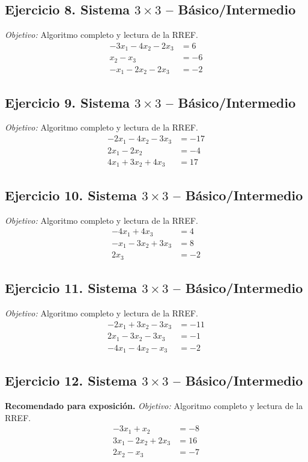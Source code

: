 \documentclass[12pt]{article}
\theoremstyle{remark}
\begin{document}
\subsection*{Ejercicio 8. Sistema $3\times3$ -- Básico/Intermedio}
\emph{Objetivo:} Algoritmo completo y lectura de la RREF.
\[
\begin{aligned}
- 3 x_{1} - 4 x_{2} - 2 x_{3} &= 6\\
x_{2} - x_{3} &= -6\\
- x_{1} - 2 x_{2} - 2 x_{3} &= -2
\end{aligned}
\]
\subsection*{Ejercicio 9. Sistema $3\times3$ -- Básico/Intermedio}
\emph{Objetivo:} Algoritmo completo y lectura de la RREF.
\[
\begin{aligned}
- 2 x_{1} - 4 x_{2} - 3 x_{3} &= -17\\
2 x_{1} - 2 x_{2} &= -4\\
4 x_{1} + 3 x_{2} + 4 x_{3} &= 17
\end{aligned}
\]
\subsection*{Ejercicio 10. Sistema $3\times3$ -- Básico/Intermedio}
\emph{Objetivo:} Algoritmo completo y lectura de la RREF.
\[
\begin{aligned}
- 4 x_{1} + 4 x_{3} &= 4\\
- x_{1} - 3 x_{2} + 3 x_{3} &= 8\\
2 x_{3} &= -2
\end{aligned}
\]
\subsection*{Ejercicio 11. Sistema $3\times3$ -- Básico/Intermedio}
\emph{Objetivo:} Algoritmo completo y lectura de la RREF.
\[
\begin{aligned}
- 2 x_{1} + 3 x_{2} - 3 x_{3} &= -11\\
2 x_{1} - 3 x_{2} - 3 x_{3} &= -1\\
- 4 x_{1} - 4 x_{2} - x_{3} &= -2
\end{aligned}
\]
\subsection*{Ejercicio 12. Sistema $3\times3$ -- Básico/Intermedio}
\textbf{Recomendado para exposición.} \emph{Objetivo:} Algoritmo completo y lectura de la RREF.
\[
\begin{aligned}
- 3 x_{1} + x_{2} &= -8\\
3 x_{1} - 2 x_{2} + 2 x_{3} &= 16\\
2 x_{2} - x_{3} &= -7
\end{aligned}
\]
\end{document}

